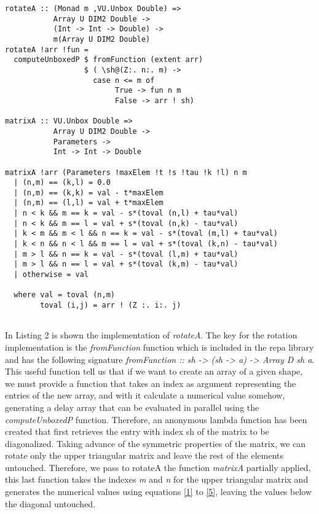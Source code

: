 \documentclass{tmr}
\begin{document}
\begin{lstlisting}[float,captionpos=b,belowcaptionskip=4pt, caption= rotateA function]
rotateA :: (Monad m ,VU.Unbox Double) =>
           Array U DIM2 Double ->
           (Int -> Int -> Double) ->
           m(Array U DIM2 Double)           
rotateA !arr !fun =
  computeUnboxedP $ fromFunction (extent arr)
                  $ ( \sh@(Z:. n:. m) ->
                    case n <= m of
                         True -> fun n m
                         False -> arr ! sh)

matrixA :: VU.Unbox Double =>
           Array U DIM2 Double ->
           Parameters ->           
           Int -> Int -> Double
           
matrixA !arr (Parameters !maxElem !t !s !tau !k !l) n m
  | (n,m) == (k,l) = 0.0
  | (n,m) == (k,k) = val - t*maxElem
  | (n,m) == (l,l) = val + t*maxElem
  | n < k && m == k = val - s*(toval (n,l) + tau*val)
  | n < k && m == l = val + s*(toval (n,k) - tau*val)
  | k < m && m < l && n == k = val - s*(toval (m,l) + tau*val)
  | k < n && n < l && m == l = val + s*(toval (k,n) - tau*val)
  | m > l && n == k = val - s*(toval (l,m) + tau*val)
  | m > l && n == l = val + s*(toval (k,m) - tau*val)
  | otherwise = val

  where val = toval (n,m)
        toval (i,j) = arr ! (Z :. i:. j)
                   
\end{lstlisting}
In Listing 2 is shown the implementation of \textit{rotateA}. The key for the rotation
implementation is the \textit{fromFunction} function which is included in the 
repa library and has the following signature 
\textit{fromFunction :: sh -> (sh -> a) -> Array D sh a}.
This useful function tell us that if we want to create an array of a given shape,
we must provide a function that takes an index as argument representing the entries of
the new array, and with it calculate a numerical value somehow,
generating a delay array that can be evaluated in parallel using the \textit{computeUnboxedP} function.
Therefore, an anonymous lambda function has been created that first retrieves the entry with index sh 
of the matrix to be diagonalized. Taking advance of the symmetric properties of the matrix, we can 
rotate only the upper triangular matrix and leave the rest of the elements untouched. Therefore, we pass
to rotateA the function \textit{matrixA} partially applied, this last function takes the indexes \textit{m}
and \textit{n} for the upper triangular matrix and generates the numerical values using equations 
\eqref{1} to \eqref{5}, leaving the values below the diagonal untouched.
\end{document}
